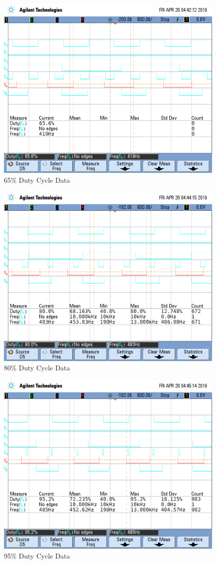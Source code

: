 \documentclass[a4paper, 12pt]{article}
\begin{document}
\begin{figure}[H]
\centering
\includegraphics[width=.8\textwidth]{scope_7.png}
\caption{65\% Duty Cycle Data}
\label{fig:data65}
\end{figure}

\begin{figure}[H]
\centering
\includegraphics[width=.8\textwidth]{scope_8.png}
\caption{80\% Duty Cycle Data}
\label{fig:data80}
\end{figure}

\begin{figure}[H]
\centering
\includegraphics[width=.8\textwidth]{scope_9.png}
\caption{95\% Duty Cycle Data}
\label{fig:data95}
\end{figure}
\end{document}
